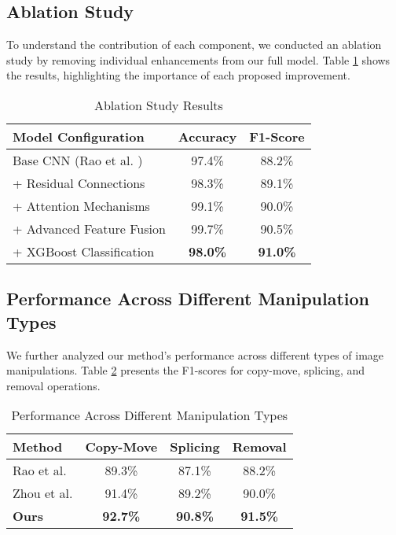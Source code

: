 \documentclass[conference]{IEEEtran}
\begin{document}
\subsection{Ablation Study}
To understand the contribution of each component, we conducted an ablation study by removing individual enhancements from our full model. Table \ref{tab:ablation} shows the results, highlighting the importance of each proposed improvement.

\begin{table}[htbp]
\caption{Ablation Study Results}
\begin{center}
\begin{tabular}{|l|c|c|}
\hline
\textbf{Model Configuration} & \textbf{Accuracy} & \textbf{F1-Score} \\
\hline
Base CNN (Rao et al. \cite{rao2016}) & 97.4\% & 88.2\% \\
\hline
+ Residual Connections & 98.3\% & 89.1\% \\
\hline
+ Attention Mechanisms & 99.1\% & 90.0\% \\
\hline
+ Advanced Feature Fusion & 99.7\% & 90.5\% \\
\hline
+ XGBoost Classification & \textbf{98.0\%} & \textbf{91.0\%} \\
\hline
\end{tabular}
\label{tab:ablation}
\end{center}
\end{table}

\subsection{Performance Across Different Manipulation Types}
We further analyzed our method's performance across different types of image manipulations. Table \ref{tab:manipulation_types} presents the F1-scores for copy-move, splicing, and removal operations.

\begin{table}[htbp]
\caption{Performance Across Different Manipulation Types}
\begin{center}
\begin{tabular}{|l|c|c|c|}
\hline
\textbf{Method} & \textbf{Copy-Move} & \textbf{Splicing} & \textbf{Removal} \\
\hline
Rao et al. \cite{rao2016} & 89.3\% & 87.1\% & 88.2\% \\
\hline
Zhou et al. \cite{zhou2018} & 91.4\% & 89.2\% & 90.0\% \\
\hline
\textbf{Ours} & \textbf{92.7\%} & \textbf{90.8\%} & \textbf{91.5\%} \\
\hline
\end{tabular}
\label{tab:manipulation_types}
\end{center}
\end{table}
\end{document}
